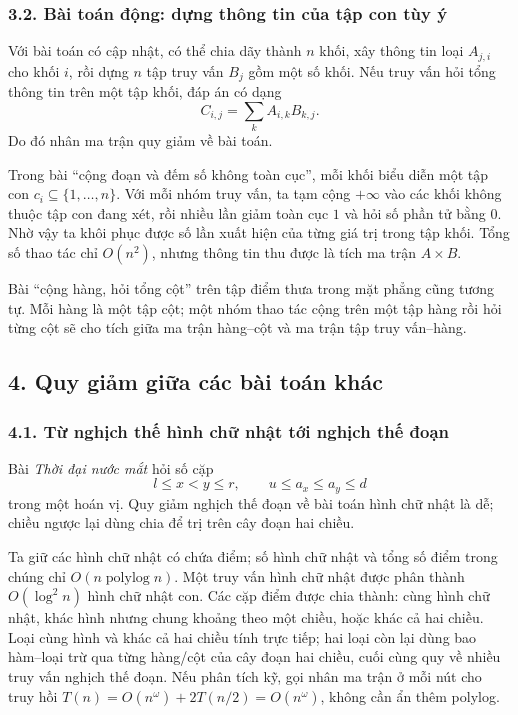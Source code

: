 \documentclass[11pt]{article}
\begin{document}
\subsubsection*{3.2. Bài toán động: dựng thông tin của tập con tùy ý}

Với bài toán có cập nhật, có thể chia dãy thành \(n\) khối, xây thông tin loại
\(A_{j,i}\) cho khối \(i\), rồi dựng \(n\) tập truy vấn \(B_j\) gồm một số khối.
Nếu truy vấn hỏi tổng thông tin trên một tập khối, đáp án có dạng
\[
  C_{i,j}=\sum_k A_{i,k}B_{k,j}.
\]
Do đó nhân ma trận quy giảm về bài toán.

Trong bài ``cộng đoạn và đếm số không toàn cục'', mỗi khối biểu diễn một tập
con \(c_i\subseteq\{1,\ldots,n\}\). Với mỗi nhóm truy vấn, ta tạm cộng
\(+\infty\) vào các khối không thuộc tập con đang xét, rồi nhiều lần giảm toàn
cục \(1\) và hỏi số phần tử bằng \(0\). Nhờ vậy ta khôi phục được số lần xuất
hiện của từng giá trị trong tập khối. Tổng số thao tác chỉ \(O(n^2)\), nhưng
thông tin thu được là tích ma trận \(A\times B\).

Bài ``cộng hàng, hỏi tổng cột'' trên tập điểm thưa trong mặt phẳng cũng tương
tự. Mỗi hàng là một tập cột; một nhóm thao tác cộng trên một tập hàng rồi hỏi
từng cột sẽ cho tích giữa ma trận hàng--cột và ma trận tập truy vấn--hàng.

\subsection*{4. Quy giảm giữa các bài toán khác}

\subsubsection*{4.1. Từ nghịch thế hình chữ nhật tới nghịch thế đoạn}

Bài \emph{Thời đại nước mắt} hỏi số cặp
\[
  l\le x<y\le r,\qquad u\le a_x\le a_y\le d
\]
trong một hoán vị. Quy giảm nghịch thế đoạn về bài toán hình chữ nhật là dễ;
chiều ngược lại dùng chia để trị trên cây đoạn hai chiều.

Ta giữ các hình chữ nhật có chứa điểm; số hình chữ nhật và tổng số điểm trong
chúng chỉ \(O(n\operatorname{polylog} n)\). Một truy vấn hình chữ nhật được
phân thành \(O(\log^2 n)\) hình chữ nhật con. Các cặp điểm được chia thành:
cùng hình chữ nhật, khác hình nhưng chung khoảng theo một chiều, hoặc khác cả
hai chiều. Loại cùng hình và khác cả hai chiều tính trực tiếp; hai loại còn lại
dùng bao hàm--loại trừ qua từng hàng/cột của cây đoạn hai chiều, cuối cùng quy
về nhiều truy vấn nghịch thế đoạn. Nếu phân tích kỹ, gọi nhân ma trận ở mỗi nút
cho truy hồi \(T(n)=O(n^\omega)+2T(n/2)=O(n^\omega)\), không cần ẩn thêm
polylog.
\end{document}
